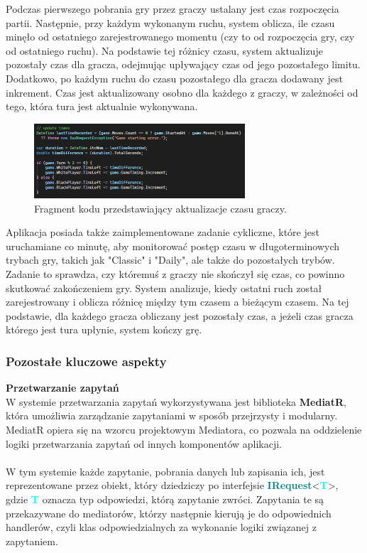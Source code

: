 \documentclass[12pt,a4paper]{article}
\begin{document}
\noindent
Podczas pierwszego pobrania gry przez graczy ustalany jest czas rozpoczęcia partii. Następnie, przy każdym wykonanym ruchu, system oblicza, ile czasu minęło od ostatniego zarejestrowanego momentu (czy to od rozpoczęcia gry, czy od ostatniego ruchu). Na podstawie tej różnicy czasu, system aktualizuje pozostały czas dla gracza, odejmując upływający czas od jego pozostałego limitu. Dodatkowo, po każdym ruchu do czasu pozostałego dla gracza dodawany jest inkrement. Czas jest aktualizowany osobno dla każdego z graczy, w zależności od tego, która tura jest aktualnie wykonywana.

\vspace{0.5cm}
\begin{figure}[h!]
    \centering
    \includegraphics[width=0.7\textwidth]{images/ex_update_times.png}
    \caption{Fragment kodu przedstawiający aktualizacje czasu graczy.}
\end{figure}
\vspace{0.5cm}

Aplikacja posiada także zaimplementowane zadanie cykliczne, które jest uruchamiane co minutę, aby monitorować postęp czasu w długoterminowych trybach gry, takich jak "Classic" i "Daily", ale także do pozostałych trybów. Zadanie to sprawdza, czy któremuś z graczy nie skończył się czas, co powinno skutkować zakończeniem gry. System analizuje, kiedy ostatni ruch został zarejestrowany i oblicza różnicę między tym czasem a bieżącym czasem. Na tej podstawie, dla każdego gracza obliczany jest pozostały czas, a jeżeli czas gracza którego jest tura upłynie, system kończy grę.

\newpage

\subsubsection{Pozostałe kluczowe aspekty}

\noindent \textbf{Przetwarzanie zapytań}\\
W systemie przetwarzania zapytań wykorzystywana jest biblioteka \textbf{MediatR}, która umożliwia zarządzanie zapytaniami w sposób przejrzysty i modularny. MediatR opiera się na wzorcu projektowym Mediatora, co pozwala na oddzielenie logiki przetwarzania zapytań od innych komponentów aplikacji.
\\\\
W tym systemie każde zapytanie, pobrania danych lub zapisania ich, jest reprezentowane przez obiekt, który dziedziczy po interfejsie 
\textcolor{teal}{\textbf{IRequest}}<\textcolor{cyan}{\textbf{T}}>, 
gdzie \textcolor{cyan}{\textbf{T}} oznacza typ odpowiedzi, którą zapytanie zwróci. Zapytania te są przekazywane do mediatorów, którzy następnie kierują je do odpowiednich handlerów, czyli klas odpowiedzialnych za wykonanie logiki związanej z zapytaniem.
\\\\
\end{document}
